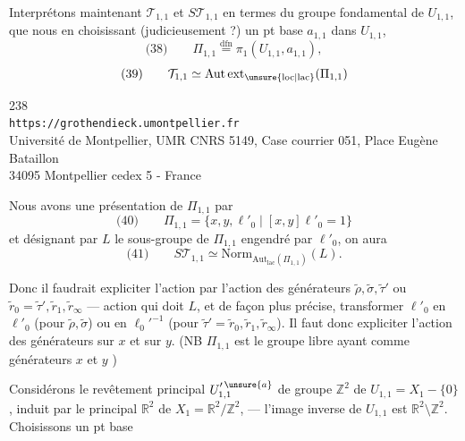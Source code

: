 Interprétons maintenant $\mathcal T_{1,1}$ et $S\mathcal T_{1,1}$ en termes du groupe fondamental de $U_{1,1}$, que nous  en choisissant (judicieusement ?) un pt base $a_{1,1}$ dans $U_{1,1}$,
\[
\text{(38)}\qquad
\Pi_{1,1}\overset{\mathrm{dfn}}=\pi_1(U_{1,1},a_{1,1}),
\]
\[
\text{(39)}\qquad
\mathcal T_{1,1}\simeq\mathrm{Aut\,ext}_{\unsure{\mathrm{loc}|\mathrm{lac}}}(\Pi_{1,1})
\]

\begin{center}
238\\
\texttt{https://grothendieck.umontpellier.fr}\\
Université de Montpellier, UMR CNRS 5149, Case courrier 051, Place Eugène Bataillon\\
34095 Montpellier cedex 5 - France
\end{center}



Nous avons une présentation de $\Pi_{1,1}$ par
\[
\text{(40)}\qquad
\Pi_{1,1}=\{x,y,\ell'_0\mid [x,y]\ell'_0=1\}
\]
et désignant par $L$ le sous-groupe de $\Pi_{1,1}$ engendré par $\ell'_0$, on aura
\[
\text{(41)}\qquad
S\mathcal T_{1,1}\simeq
\mathrm{Norm}_{\mathrm{Aut}_{\mathrm{lac}}(\Pi_{1,1})}(L).
\]

Donc il faudrait expliciter l'action
par l'action des générateurs $\widetilde\rho,\widetilde\sigma,\widetilde\tau'$ ou $\widetilde r_0=\widetilde\tau',\widetilde r_1,\widetilde r_\infty$ --- action qui doit  $L$, et de façon plus précise, transformer $\ell'_0$ en $\ell'_0$ (pour $\widetilde\rho,\widetilde\sigma$) ou en $\ell_0'^{-1}$ (pour $\widetilde\tau'=\widetilde r_0,\widetilde r_1,\widetilde r_\infty$). Il faut donc expliciter l'action des générateurs sur $x$ et sur $y$. (NB $\Pi_{1,1}$ est le groupe libre ayant comme générateurs $x$ et $y$ \unsure{!})

Considérons le revêtement principal $U_{1,1}^{\prime\,\unsure{a}}$ de groupe $\mathbb Z^2$ de $U_{1,1}=X_1-\{0\}$, induit par le  principal $\mathbb R^2$ de $X_1=\mathbb R^2/\mathbb Z^2$, --- l'image inverse de $U_{1,1}$ est $\mathbb R^2\setminus\mathbb Z^2$. Choisissons un pt base 

